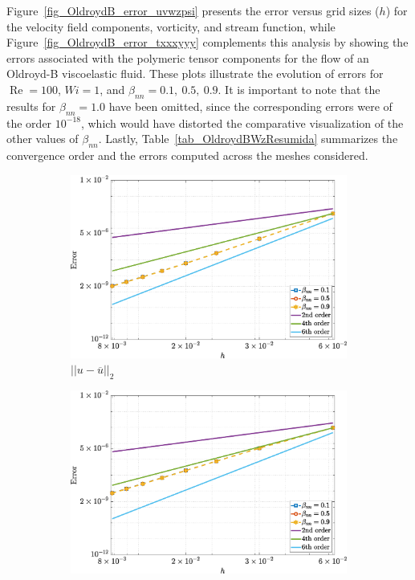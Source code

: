 \documentclass[preprint, 12pt]{elsarticle}
\begin{document}
Figure~\ref{fig_OldroydB_error_uvwzpsi} presents the error versus grid sizes ($h$) for the velocity field components, vorticity, and stream function, while Figure~\ref{fig_OldroydB_error_txxxyyy} complements this analysis by showing the errors associated with the polymeric tensor components for the flow of an Oldroyd-B viscoelastic fluid. These plots illustrate the evolution of errors for $\operatorname{Re}=100$, $Wi=1$, and $\beta_{nn}=0.1,\ 0.5,\ 0.9$. It is important to note that the results for $\beta_{nn}=1.0$ have been omitted, since the corresponding errors were of the order $10^{-18}$, which would have distorted the comparative visualization of the other values of $\beta_{nn}$. Lastly, Table~\ref{tab_OldroydBWzResumida} summarizes the convergence order and the errors computed across the meshes considered.
\begin{figure}[H]
    \centering  
    \begin{subfigure}[b]{.46\textwidth}
        \includegraphics[width=\textwidth]{NormErr_2nd_Re_100_Wi_1_epsilon_0_xi_0_alphaG_0_Dt_1e-06_at_0.05_tipsim_1_MMS_12_U.eps}
        \caption{$||u - \overline{u}||_{2}$}
        \label{error_u_2nd_Case1_oldorydb}
    \end{subfigure}
    \vspace{0.2cm}
    \qquad
    \begin{subfigure}[b]{.46\textwidth}
        \includegraphics[width=\textwidth]{NormErr_2nd_Re_100_Wi_1_epsilon_0_xi_0_alphaG_0_Dt_1e-06_at_0.05_tipsim_1_MMS_12_V.eps}

\end{subfigure}
\end{figure}
\end{document}
